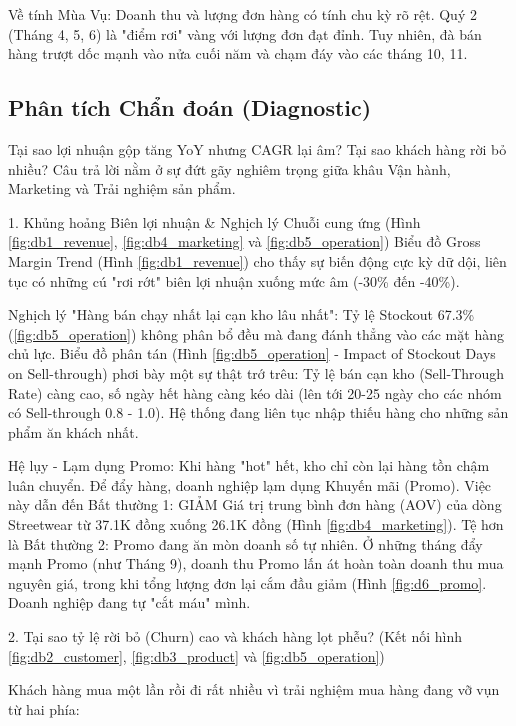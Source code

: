 \documentclass{article}
\begin{document}
Về tính Mùa Vụ: Doanh thu và lượng đơn hàng có tính chu kỳ rõ rệt. Quý 2 (Tháng 4, 5, 6) là "điểm rơi" vàng với lượng đơn đạt đỉnh. Tuy nhiên, đà bán hàng trượt dốc mạnh vào nửa cuối năm và chạm đáy vào các tháng 10, 11.





\subsection{Phân tích Chẩn đoán (Diagnostic)}

Tại sao lợi nhuận gộp tăng YoY nhưng CAGR lại âm? Tại sao khách hàng rời bỏ nhiều? Câu trả lời nằm ở sự đứt gãy nghiêm trọng giữa khâu Vận hành, Marketing và Trải nghiệm sản phẩm.

1. Khủng hoảng Biên lợi nhuận \& Nghịch lý Chuỗi cung ứng (Hình \ref{fig:db1_revenue}, \ref{fig:db4_marketing} và \ref{fig:db5_operation}) Biểu đồ Gross Margin Trend (Hình \ref{fig:db1_revenue}) cho thấy sự biến động cực kỳ dữ dội, liên tục có những cú "rơi rớt" biên lợi nhuận xuống mức âm (-30\% đến -40\%).

Nghịch lý "Hàng bán chạy nhất lại cạn kho lâu nhất": Tỷ lệ Stockout 67.3\% (\ref{fig:db5_operation}) không phân bổ đều mà đang đánh thẳng vào các mặt hàng chủ lực. Biểu đồ phân tán (Hình \ref{fig:db5_operation} - Impact of Stockout Days on Sell-through) phơi bày một sự thật trớ trêu: Tỷ lệ bán cạn kho (Sell-Through Rate) càng cao, số ngày hết hàng càng kéo dài (lên tới 20-25 ngày cho các nhóm có Sell-through 0.8 - 1.0). Hệ thống đang liên tục nhập thiếu hàng cho những sản phẩm ăn khách nhất.

Hệ lụy - Lạm dụng Promo: Khi hàng "hot" hết, kho chỉ còn lại hàng tồn chậm luân chuyển. Để đẩy hàng, doanh nghiệp lạm dụng Khuyến mãi (Promo). Việc này dẫn đến Bất thường 1: GIẢM Giá trị trung bình đơn hàng (AOV) của dòng Streetwear từ 37.1K đồng xuống 26.1K đồng (Hình \ref{fig:db4_marketing}). Tệ hơn là Bất thường 2: Promo đang ăn mòn doanh số tự nhiên. Ở những tháng đẩy mạnh Promo (như Tháng 9), doanh thu Promo lấn át hoàn toàn doanh thu mua nguyên giá, trong khi tổng lượng đơn lại cắm đầu giảm (Hình \ref{fig:d6_promo}. Doanh nghiệp đang tự "cắt máu" mình.

2. Tại sao tỷ lệ rời bỏ (Churn) cao và khách hàng lọt phễu? (Kết nối hình \ref{fig:db2_customer}, \ref{fig:db3_product} và \ref{fig:db5_operation}) 

Khách hàng mua một lần rồi đi rất nhiều vì trải nghiệm mua hàng đang vỡ vụn từ hai phía:
\end{document}

